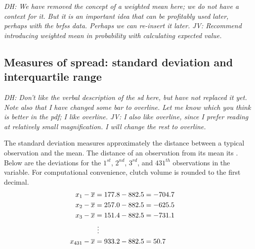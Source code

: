 \begin{doublespace}

\textit{DH: We have removed the concept of a weighted mean here; we do not have a context for it.  But it is an important idea that can be profitably used later, perhaps with the brfss data.  Perhaps we can re-insert it later. JV: Recommend introducing weighted mean in probability with calculating expected value.}

\subsection{Measures of spread: standard deviation and interquartile range}
\label{measuresOfSpread}

\textit{DH: Don't like the verbal description of the sd here, but have not replaced it yet.  Note also that I have changed some bar to overline.  Let me know which you think is better in the pdf; I like overline. JV: I also like overline, since I prefer reading at relatively small magnification. I will change the rest to overline.}

The standard deviation measures approximately the distance between a  typical observation and the mean. The distance of an observation from its mean its . Below are the deviations for the $1^{st}$, $2^{nd}$, $3^{rd}$, and $431^{th}$ observations in the  variable. For computational convenience, clutch volume is rounded to the first decimal.
\begin{align*}
x_1-\overline{x} &= 177.8 - 882.5 = -704.7 \hspace{5mm}\text{ } \\
x_2-\overline{x} &= 257.0 - 882.5 = -625.5 \\
x_3-\overline{x} &= 151.4 - 882.5 = -731.1 \\
&\ \vdots \\
x_{431}-\overline{x} &= 933.2 - 882.5 = 50.7
\end{align*}


\end{doublespace}
